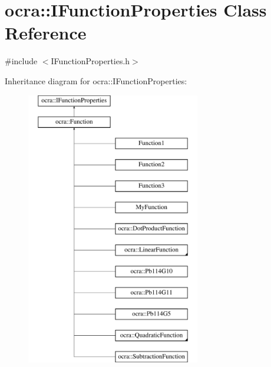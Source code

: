 \hypertarget{classocra_1_1IFunctionProperties}{}\section{ocra\+:\+:I\+Function\+Properties Class Reference}
\label{classocra_1_1IFunctionProperties}


{\ttfamily \#include $<$I\+Function\+Properties.\+h$>$}

Inheritance diagram for ocra\+:\+:I\+Function\+Properties\+:\begin{figure}[H]
\begin{center}
\leavevmode
\includegraphics[height=12.000000cm]{dd/d68/classocra_1_1IFunctionProperties}
\end{center}
\end{figure}
